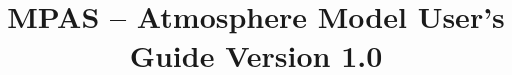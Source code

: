 \documentclass[11pt]{report}
\newcommand{\version}{1.0}
\begin{document}
\title{\bf \hfil MPAS -- Atmosphere Model User's Guide \hfil \break \hfil \break Version \version}


\maketitle



\tableofcontents








\appendix





\end{document}
